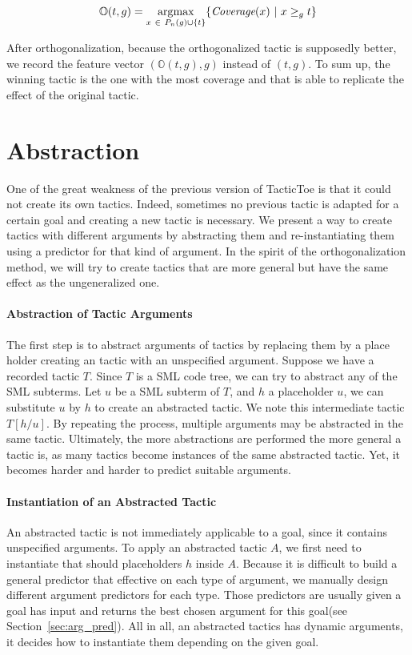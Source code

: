 \documentclass[runningheads,a4paper,draft]{svjour3}
\DeclareMathOperator*{\argmax}{\arg\!\max}
\def\sml{\textsf{SML}\xspace}
\def\tactictoe{\textsf{TacticToe}\xspace}
\begin{document}
\[\mathbb{O}(t,g) = \argmax_{x\ \in\ P_n(g) \cup \lbrace t \rbrace} \lbrace 
\textit{\mbox{Coverage}}(x)\ 
|\ x \ge_g t\rbrace\] 
                   
After orthogonalization, because the orthogonalized tactic is supposedly 
better, we record the feature vector $(\mathbb{O}(t,g),g)$ instead of 
$(t,g)$. To sum up, the winning tactic is the one with the most coverage and 
that is able to replicate the effect of the original tactic.



\section{Abstraction}\label{sec:synthesis}
One of the great weakness of the previous version of \tactictoe is that
it could not create its own tactics. Indeed, sometimes no previous tactic is 
adapted for a certain goal and creating a new tactic is necessary.
We present a way to create tactics with different arguments
by abstracting them and re-instantiating them using a predictor for that kind 
of argument. In the spirit of the orthogonalization method, we will try to 
create tactics that are more general but have the same effect as the 
ungeneralized one.

\paragraph{Abstraction of Tactic Arguments}
The first step is to abstract arguments of tactics by replacing them by a 
place holder creating an tactic with an unspecified argument.
Suppose we have a recorded tactic $T$. Since $T$ is a \sml code tree, we can 
try to abstract any of the 
\sml subterms. Let $u$ be a \sml subterm of $T$, and $h$ a placeholder $u$, we 
can substitute $u$ by $h$ to create an abstracted tactic.
We note this intermediate tactic $T[h/u]$. By repeating the process, multiple 
arguments may be abstracted in the same tactic. Ultimately, the more 
abstractions are performed the more general a tactic is, as many tactics 
become instances of the same abstracted tactic. Yet, it becomes harder and 
harder to predict suitable arguments. 

\paragraph{Instantiation of an Abstracted Tactic}
An abstracted tactic is not immediately applicable to a goal, since it contains
unspecified arguments. To apply an abstracted tactic $A$, we first need to 
instantiate that should placeholders $h$ inside $A$. Because it is difficult to 
build a general predictor that effective on each type of argument, we manually 
design different argument predictors for each type. Those predictors are 
usually given a goal has input and returns the best chosen argument for this 
goal(see Section~\ref{sec:arg_pred}). All in all, an abstracted tactics has 
dynamic arguments, it decides how to instantiate them depending on the given 
goal. 
\end{document}
